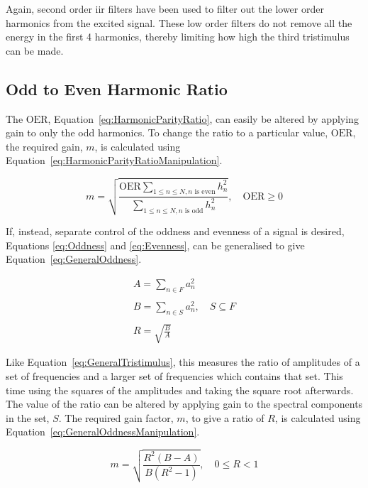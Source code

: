 		Again, second order \acrshort{iir} filters have been used to filter out the lower order harmonics from the
		excited signal.	These low order filters do not remove all the energy in the first 4 harmonics, thereby
		limiting how high the third tristimulus can be made.

	\subsection{Odd to Even Harmonic Ratio}
	\label{sec:FeatureControl-Parameterisation-HarmonicParityRatio}
		The $\mathrm{OER}$, Equation~\ref{eq:HarmonicParityRatio}, can easily be altered by applying gain to only
		the odd harmonics. To change the ratio to a particular value, $\mathrm{OER}$, the required gain, $m$, is
		calculated using Equation~\ref{eq:HarmonicParityRatioManipulation}.

		\begin{equation}
			m = \sqrt{\frac{\mathrm{OER}\sum_{1 \leq n \leq N, n \text{ is even}} h_{n}^{2}}
				       {\sum_{1 \leq n \leq N, n \text{ is odd}} h_{n}^{2}}},
				       \quad \mathrm{OER} \geq 0
		       \label{eq:HarmonicParityRatioManipulation}
		\end{equation}

		If, instead, separate control of the oddness and evenness of a signal is desired, Equations
		\ref{eq:Oddness} and \ref{eq:Evenness}, can be generalised to give Equation~\ref{eq:GeneralOddness}.

		\begin{gather}
			A = \sum_{n \in F} a_{n}^{2} \nonumber \\
			\nonumber \\
			B = \sum_{n \in S} a_{n}^{2}, \quad S \subseteq F \nonumber \\
			\nonumber \\
			R = \sqrt{\frac{B}{A}}
			\label{eq:GeneralOddness}
		\end{gather}

		Like Equation~\ref{eq:GeneralTristimulus}, this measures the ratio of amplitudes of a set of frequencies
		and a larger set of frequencies which contains that set. This time using the squares of the amplitudes and
		taking the square root afterwards. The value of the ratio can be altered by applying gain to the spectral
		components in the set, $S$. The required gain factor, $m$, to give a ratio of $R$, is calculated using
		Equation~\ref{eq:GeneralOddnessManipulation}.

		\begin{equation}
			m = \sqrt{\frac{R^{2}(B - A)}{B(R^{2} - 1)}}, \quad 0 \leq R < 1
			\label{eq:GeneralOddnessManipulation}
		\end{equation}


